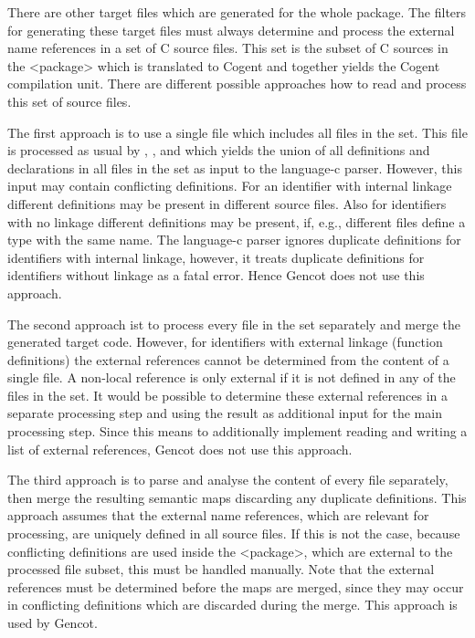There are other target files which are generated for the whole package. The filters for generating these target files 
must always determine and process the external name references in a set of
C source files. This set is the subset of C sources in the <package> which is translated to Cogent and together yields
the Cogent compilation unit. There are different possible approaches how to read and process this set of source files.

The first approach is to use a single file which includes all files in the set. This file is processed as usual by
, , and  which yields the union of all definitions
and declarations in all files in the set as input to the language-c parser. However, this input may contain conflicting
definitions. For an identifier with internal linkage different definitions may be present in different source files.
Also for identifiers with no linkage different definitions may be present, if, e.g., different  files define
a type with the same name. The language-c parser ignores duplicate definitions for identifiers with internal linkage,
however, it treats duplicate definitions for identifiers without linkage as a fatal error. Hence Gencot does not use
this approach.

The second approach ist to process every file in the set separately and merge the generated target code. However, for
identifiers with external linkage (function definitions) the external references cannot be determined from the content
of a single file. A non-local reference is only external if it is not defined in any of the files in the set. It would
be possible to determine these external references in a separate processing step and using the result as additional input
for the main processing step. Since this means to additionally implement reading and writing a list of external references,
Gencot does not use this approach.

The third approach is to parse and analyse the content of every file separately, then merge the resulting semantic maps
discarding any duplicate definitions. This approach assumes that the external name references, which are relevant for
processing, are uniquely defined in all source files. If this is not the case, because conflicting definitions are used
inside the <package>, which are external to the processed file subset, this must be handled manually. Note that the
external references must be determined before the maps are merged, since they may occur in conflicting definitions
which are discarded during the merge. This approach is used by Gencot.

